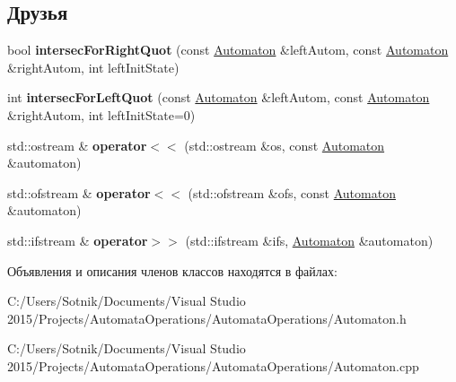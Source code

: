\subsection*{Друзья}
\begin{DoxyCompactItemize}
\item 
\mbox{\label{class_automaton_a58d59524004b386b891b6ba361bba8b3}} 
bool {\bfseries intersec\+For\+Right\+Quot} (const \mbox{\hyperlink{class_automaton}{Automaton}} \&left\+Autom, const \mbox{\hyperlink{class_automaton}{Automaton}} \&right\+Autom, int left\+Init\+State)
\item 
\mbox{\label{class_automaton_a9b68d0df0ac0afb8832cf202226be217}} 
int {\bfseries intersec\+For\+Left\+Quot} (const \mbox{\hyperlink{class_automaton}{Automaton}} \&left\+Autom, const \mbox{\hyperlink{class_automaton}{Automaton}} \&right\+Autom, int left\+Init\+State=0)
\item 
\mbox{\label{class_automaton_a5ab2e601e3ac7567e9ceaf410ebb9762}} 
std\+::ostream \& {\bfseries operator$<$$<$} (std\+::ostream \&os, const \mbox{\hyperlink{class_automaton}{Automaton}} \&automaton)
\item 
\mbox{\label{class_automaton_ab49c0362ae9daafaffd1e252601c1874}} 
std\+::ofstream \& {\bfseries operator$<$$<$} (std\+::ofstream \&ofs, const \mbox{\hyperlink{class_automaton}{Automaton}} \&automaton)
\item 
\mbox{\label{class_automaton_aa21b7fbccaa6a68ec1cc285f490dc9de}} 
std\+::ifstream \& {\bfseries operator$>$$>$} (std\+::ifstream \&ifs, \mbox{\hyperlink{class_automaton}{Automaton}} \&automaton)
\end{DoxyCompactItemize}


Объявления и описания членов классов находятся в файлах\+:\begin{DoxyCompactItemize}
\item 
C\+:/\+Users/\+Sotnik/\+Documents/\+Visual Studio 2015/\+Projects/\+Automata\+Operations/\+Automata\+Operations/Automaton.\+h\item 
C\+:/\+Users/\+Sotnik/\+Documents/\+Visual Studio 2015/\+Projects/\+Automata\+Operations/\+Automata\+Operations/Automaton.\+cpp\end{DoxyCompactItemize}
